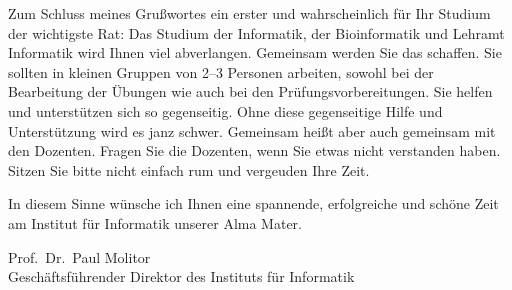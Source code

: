 Zum Schluss meines Grußwortes ein erster und wahrscheinlich für Ihr Studium der
wichtigste Rat: Das Studium der Informatik, der Bioinformatik und Lehramt
Informatik wird Ihnen viel abverlangen. Gemeinsam werden Sie das schaffen. Sie
sollten in kleinen Gruppen von 2--3 Personen arbeiten, sowohl bei der
Bearbeitung der Übungen wie auch bei den Prüfungsvorbereitungen. Sie helfen und
unterstützen sich so gegenseitig. Ohne diese gegenseitige Hilfe und
Unterstützung wird es janz schwer. Gemeinsam heißt aber auch gemeinsam mit den
Dozenten. Fragen Sie die Dozenten, wenn Sie etwas nicht verstanden haben. Sitzen
Sie bitte nicht einfach rum und vergeuden Ihre Zeit.

In diesem Sinne wünsche ich Ihnen eine spannende, erfolgreiche und schöne Zeit
am Institut für Informatik unserer Alma Mater.

Prof.\ Dr.\ Paul Molitor \\
Geschäftsführender Direktor des Instituts für Informatik
